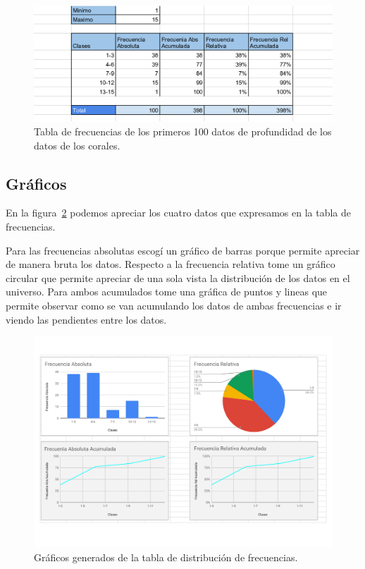 \documentclass[12pt]{article}
\begin{document}
	
	\begin{figure}[h]
	\centering
		\includegraphics[width=1.0\textwidth]{dataset_coral-frecuencias.png}
	\caption{Tabla de frecuencias de los primeros 100 datos de profundidad de los datos de los corales.}
	\label{fig: tabla frecuencia}
\end{figure}

	

\subsection{Gráficos}

	\par En la figura~\ref{fig: graficos} podemos apreciar los cuatro datos que expresamos en la tabla de frecuencias.
	\par Para las frecuencias absolutas escogí un gráfico de barras porque permite apreciar de manera bruta los datos. Respecto a la frecuencia relativa tome un gráfico circular que permite apreciar de una sola vista la distribución de los datos en el universo. Para ambos acumulados tome una gráfica de puntos y lineas que permite observar como se van acumulando los datos de ambas frecuencias e ir viendo las pendientes entre los datos.
	
	\begin{figure}[h]
	\centering
		\includegraphics[width=1\textwidth]{dataset_coral-graficos.png}
	\caption{Gr\'aficos generados de la tabla de distribuci\'on de frecuencias.}
	\label{fig: graficos}
\end{figure}
\end{document}
